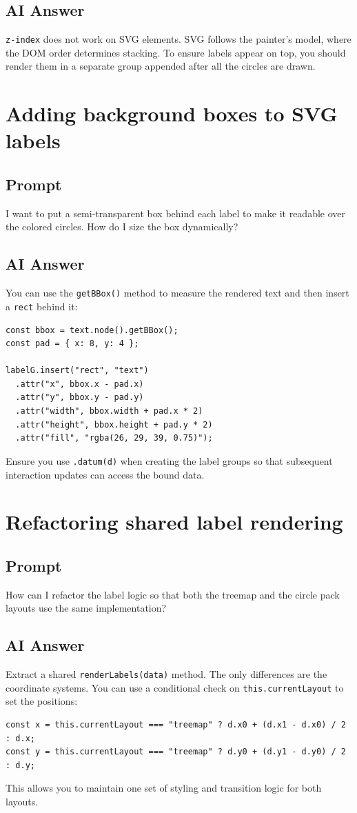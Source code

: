 \documentclass[11pt]{article}
\begin{document}
\subsection*{AI Answer}
\texttt{z-index} does not work on SVG elements. SVG follows the painter's model, where the DOM order determines stacking. To ensure labels appear on top, you should render them in a separate group appended after all the circles are drawn.

\section{Adding background boxes to SVG labels}
\subsection*{Prompt}
I want to put a semi-transparent box behind each label to make it readable over the colored circles. How do I size the box dynamically?

\subsection*{AI Answer}
You can use the \texttt{getBBox()} method to measure the rendered text and then insert a \texttt{rect} behind it:
\begin{Verbatim}[fontsize=\small]
const bbox = text.node().getBBox();
const pad = { x: 8, y: 4 };

labelG.insert("rect", "text")
  .attr("x", bbox.x - pad.x)
  .attr("y", bbox.y - pad.y)
  .attr("width", bbox.width + pad.x * 2)
  .attr("height", bbox.height + pad.y * 2)
  .attr("fill", "rgba(26, 29, 39, 0.75)");
\end{Verbatim}
Ensure you use \texttt{.datum(d)} when creating the label groups so that subsequent interaction updates can access the bound data.

\section{Refactoring shared label rendering}
\subsection*{Prompt}
How can I refactor the label logic so that both the treemap and the circle pack layouts use the same implementation?

\subsection*{AI Answer}
Extract a shared \texttt{renderLabels(data)} method. The only differences are the coordinate systems. You can use a conditional check on \texttt{this.currentLayout} to set the positions:
\begin{Verbatim}[fontsize=\small]
const x = this.currentLayout === "treemap" ? d.x0 + (d.x1 - d.x0) / 2 : d.x;
const y = this.currentLayout === "treemap" ? d.y0 + (d.y1 - d.y0) / 2 : d.y;
\end{Verbatim}
This allows you to maintain one set of styling and transition logic for both layouts.
\end{document}
